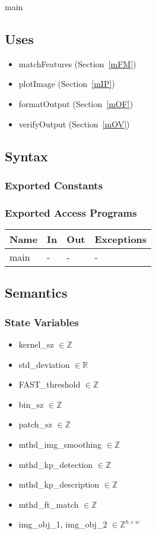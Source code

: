 \documentclass[12pt, titlepage]{article}
\begin{document}
main

\subsection{Uses}
\begin{itemize}
  \item matchFeatures (Section~\ref{mFM})
  \item plotImage (Section~\ref{mIP})
  \item formatOutput (Section~\ref{mOF})
  \item verifyOutput (Section~\ref{mOV})
\end{itemize}

\subsection{Syntax}

\subsubsection{Exported Constants}

\subsubsection{Exported Access Programs}

\begin{center}
\begin{tabular}{p{2cm} p{4cm} p{4cm} p{2cm}}
\hline
\textbf{Name} & \textbf{In} & \textbf{Out} & \textbf{Exceptions} \\
\hline
main & - & - & - \\
\hline
\end{tabular}
\end{center}

\subsection{Semantics}

\subsubsection{State Variables}
\begin{itemize}
  \item kernel\_sz $ \in \mathbb{Z}$
  \item std\_deviation $ \in \mathbb{R}$
  \item FAST\_threshold $ \in \mathbb{Z}$
  \item bin\_sz $ \in \mathbb{Z}$
  \item patch\_sz $ \in \mathbb{Z}$
  \item mthd\_img\_smoothing $ \in \mathbb{Z}$
  \item mthd\_kp\_detection $ \in \mathbb{Z}$
  \item mthd\_kp\_description $ \in \mathbb{Z}$
  \item mthd\_ft\_match $ \in \mathbb{Z}$
  \item img\_obj\_1, img\_obj\_2 $\in \mathbb{Z}^{h \times w}$ 
\end{itemize}
\end{document}
